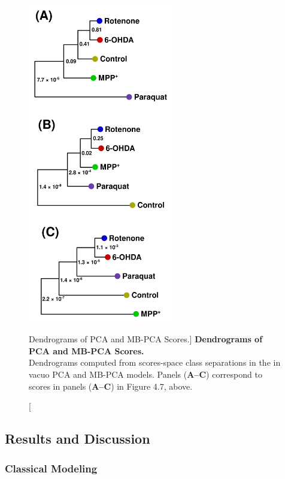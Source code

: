 \begin{figure}
\includegraphics[width=2.5in]{figs/apps/08-mbpca-d.png}
\caption
      [Dendrograms of PCA and MB-PCA Scores.]{
  {\bf Dendrograms of PCA and MB-PCA Scores.}
  \\
  Dendrograms computed from scores-space class separations
  \cite{worley:abio2013} in the in vacuo PCA and MB-PCA models. Panels
  ({\bf A--C}) correspond to scores in panels ({\bf A--C}) in Figure 4.7,
  above.
}
\label{figure.4.8}
\end{figure}

\subsection{Results and Discussion}

\subsubsection{Classical Modeling}

